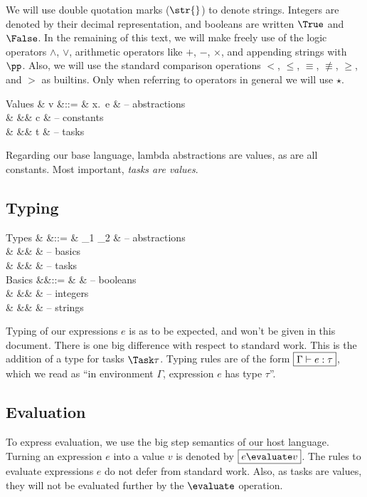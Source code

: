 We will use double quotation marks ($\str{}$) to denote strings.
Integers are denoted by their decimal representation,
and booleans are written $\True$ and $\False$.
In the remaining of this text,
we will make freely use of the logic operators $\land$, $\lor$,
arithmetic operators like $+$, $-$, $\times$,
and appending strings with $\pp$.
Also, we will use the standard comparison operations $<$, $\le$, $\equiv$, $\nequiv$, $\ge$, and $>$
as builtins.
Only when referring to operators in general we will use $\star$.



\begin{grammar}
  Values
    & v &::= & \lambda x.\ e  & – abstractions \\
    &   &\mid& c              & – constants \\
    &   &\mid& t              & – tasks \\
\end{grammar}
Regarding our base language, lambda abstractions are values, as are all constants.
Most important, \emph{tasks are values}.


\subsection{Typing}

\begin{grammar}
  Types
    & \tau &::= & \tau_1 \to \tau_2 & – abstractions \\
    &      &\mid& \beta             & – basics \\
    &      &\mid& \Task \tau        & – tasks \\
  Basics
    &\beta &::= & \Bool             & – booleans \\
    &      &\mid& \Int              & – integers \\
    &      &\mid& \String           & – strings \\
\end{grammar}
Typing of our expressions $e$ is as to be expected,
and won't be given in this document.
There is one big difference with respect to standard work.
This is the addition of a type for tasks $\Task \tau$.
Typing rules are of the form $\boxed{\Gamma \vdash e : \tau}$,
which we read as \enquote{in environment $\Gamma$, expression $e$ has type $\tau$}.


\subsection{Evaluation}

To express evaluation,
we use the big step semantics of our host language.
Turning an expression $e$ into a value $v$ is denoted by $\boxed{e \evaluate v}$.
The rules to evaluate expressions $e$ do not defer from standard work.
Also, as tasks are values, they will not be evaluated further by the $\evaluate$ operation.
